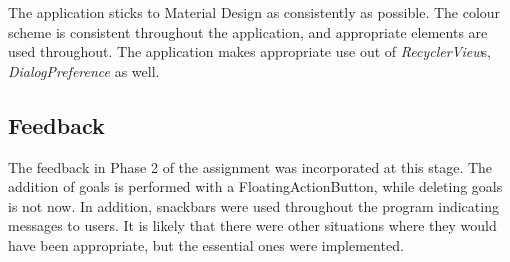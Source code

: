 \documentclass[report.tex]{subfiles}
\begin{document}
The application sticks to Material Design as consistently as possible. The
colour scheme is consistent throughout the application, and appropriate elements
are used throughout. The application makes appropriate use out of 
\emph{RecyclerView}s, \emph{DialogPreference} as well.

\subsection{Feedback} %
\label{sub:feedback}
The feedback in Phase 2 of the assignment was incorporated at this stage. The
addition of goals is performed with a FloatingActionButton, while deleting goals
is not now. In addition, snackbars were used throughout the program indicating
messages to users. It is likely that there were other situations where they
would have been appropriate, but the essential ones were implemented.

\newpage
\end{document}
